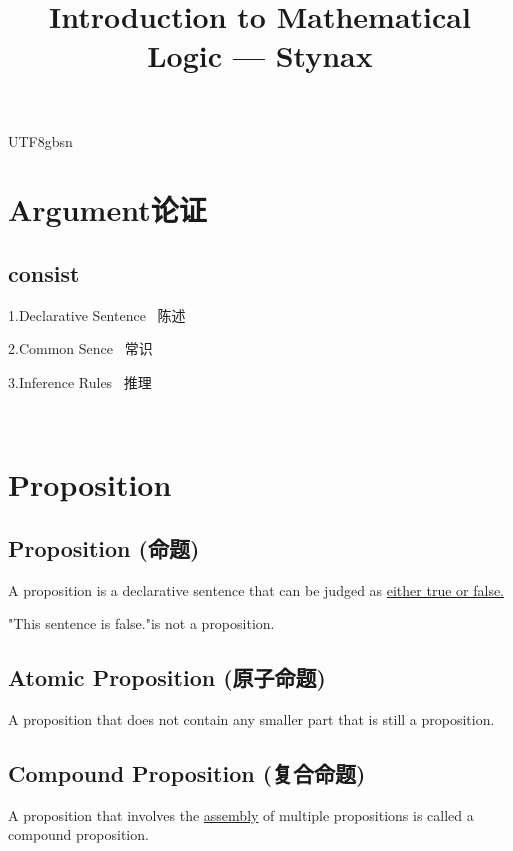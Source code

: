 \documentclass{article}
\begin{document}
\begin{CJK*}{UTF8}{gbsn}

\title{Introduction to Mathematical Logic --- Stynax}

\maketitle

{\tableofcontents}

\section{Argument论证}

\subsection{consist}

1.Declarative Sentence \ 陈述

2.Common Sence \ 常识

3.Inference Rules \ 推理

\

\section{Proposition}

\subsection{Proposition (命题)}

A proposition is a declarative sentence that can be judged as
{\underline{either true or false.}}

"This sentence is false."is not a proposition.

\subsection{Atomic Proposition (原子命题)}

A proposition that does not contain any smaller part that is still a
proposition.

\subsection{Compound Proposition (复合命题)}

A proposition that involves the {\underline{assembly}} of multiple
propositions is called a compound proposition.


\end{CJK*}
\end{document}
